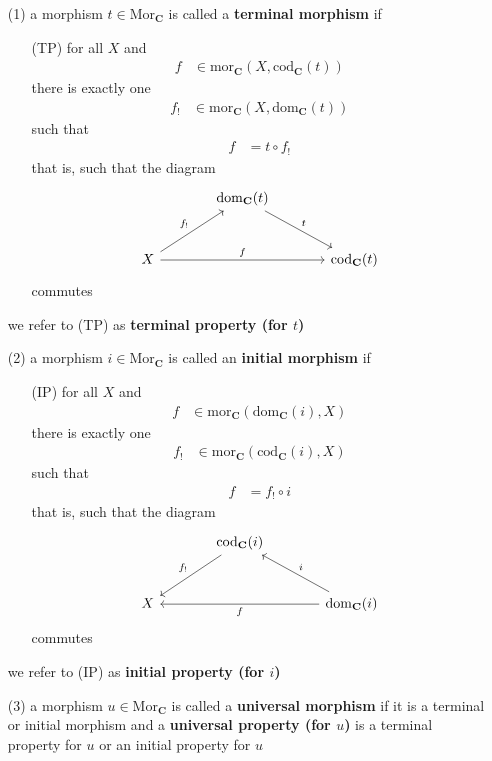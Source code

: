 \begin{enumerate}
\item[(1)]
a morphism $t \in \mathrm{Mor}_{\mathbf{C}}$ is called a \textbf{terminal morphism} if
\begin{enumerate}
\item[(TP)]
for all $X$ and
\begin{align*}
  f
  &\in
  \mathrm{mor}_{\mathbf{C}}(X,\mathrm{cod}_{\mathbf{C}}(t))
\end{align*}
there is exactly one
\begin{align*}
  f_{!}
  &\in
  \mathrm{mor}_{\mathbf{C}}(X,\mathrm{dom}_{\mathbf{C}}(t))
\end{align*}
such that
\begin{align*}
  f
  &=
  t
  \circ
  f_{!}
\end{align*}
that is, such that the diagram
\[
\begin{tikzcd}[sep=large]
  &
  \mathrm{dom}_{\mathbf{C}}(t)
  \arrow{dr}{t}
  &
  \\
  X
  \arrow{ur}{f_{!}}
  \arrow{rr}{f}
  &
  &
  \mathrm{cod}_{\mathbf{C}}(t)
\end{tikzcd}
\]
commutes
\end{enumerate}
we refer to (TP) as \textbf{terminal property (for $t$)}
\item[(2)]
a morphism $i \in \mathrm{Mor}_{\mathbf{C}}$ is called an \textbf{initial morphism} if
\begin{enumerate}
\item[(IP)]
for all $X$ and
\begin{align*}
  f
  &\in
  \mathrm{mor}_{\mathbf{C}}(\mathrm{dom}_{\mathbf{C}}(i),X)
\end{align*}
there is exactly one
\begin{align*}
  f_{!}
  &\in
  \mathrm{mor}_{\mathbf{C}}(\mathrm{cod}_{\mathbf{C}}(i),X)
\end{align*}
such that
\begin{align*}
  f
  &=
  f_{!}
  \circ
  i
\end{align*}
that is, such that the diagram
\[
\begin{tikzcd}[sep=large]
  &
  \mathrm{cod}_{\mathbf{C}}(i)
  \arrow[swap]{dl}{f_{!}}
  &
  \\
  X
  &
  &
  \mathrm{dom}_{\mathbf{C}}(i)
  \arrow{ll}{f}
  \arrow[swap]{lu}{i}
\end{tikzcd}
\]
commutes
\end{enumerate}
we refer to (IP) as \textbf{initial property (for $i$)}
\item[(3)]
a morphism $u \in \mathrm{Mor}_{\mathbf{C}}$ is called a \textbf{universal morphism} if it is a terminal or initial morphism and a \textbf{universal property (for $u$)} is a terminal property for $u$ or an initial property for $u$
\end{enumerate}
